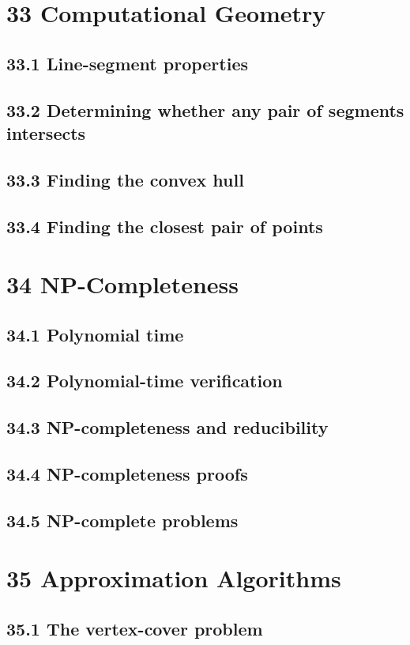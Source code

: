 \documentclass[a4paper]{article}
\begin{document}
\section{33 Computational Geometry}
\subsection{33.1 Line-segment properties}
\subsection{33.2 Determining whether any pair of segments intersects}
\subsection{33.3 Finding the convex hull}
\subsection{33.4 Finding the closest pair of points}

\section{34 NP-Completeness}
\subsection{34.1 Polynomial time}
\subsection{34.2 Polynomial-time verification}
\subsection{34.3 NP-completeness and reducibility}
\subsection{34.4 NP-completeness proofs}
\subsection{34.5 NP-complete problems}

\section{35 Approximation Algorithms}
\subsection{35.1 The vertex-cover problem}
\end{document}
